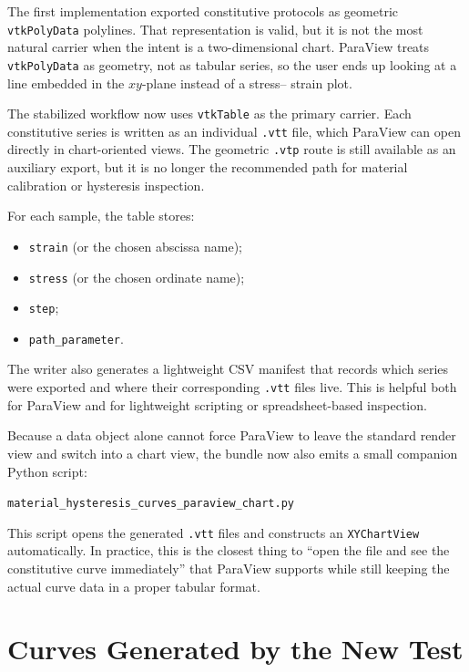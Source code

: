 The first implementation exported constitutive protocols as geometric
\texttt{vtkPolyData} polylines.  That representation is valid, but it is not
the most natural carrier when the intent is a two-dimensional chart. ParaView
treats \texttt{vtkPolyData} as geometry, not as tabular series, so the user
ends up looking at a line embedded in the \(xy\)-plane instead of a stress--
strain plot.

The stabilized workflow now uses \texttt{vtkTable} as the primary carrier.
Each constitutive series is written as an individual \texttt{.vtt} file, which
ParaView can open directly in chart-oriented views. The geometric \texttt{.vtp}
route is still available as an auxiliary export, but it is no longer the
recommended path for material calibration or hysteresis inspection.

For each sample, the table stores:

\begin{itemize}
  \item \texttt{strain} (or the chosen abscissa name);
  \item \texttt{stress} (or the chosen ordinate name);
  \item \texttt{step};
  \item \texttt{path\_parameter}.
\end{itemize}

The writer also generates a lightweight CSV manifest that records which series
were exported and where their corresponding \texttt{.vtt} files live.  This is
helpful both for ParaView and for lightweight scripting or spreadsheet-based
inspection.

Because a data object alone cannot force ParaView to leave the standard render
view and switch into a chart view, the bundle now also emits a small companion
Python script:
\begin{center}
  \texttt{material\_hysteresis\_curves\_paraview\_chart.py}
\end{center}
This script opens the generated \texttt{.vtt} files and constructs an
\texttt{XYChartView} automatically.  In practice, this is the closest thing to
``open the file and see the constitutive curve immediately'' that ParaView
supports while still keeping the actual curve data in a proper tabular format.

\section{Curves Generated by the New Test}

